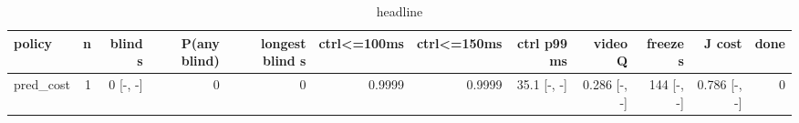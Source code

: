 \begin{table}[t]\centering\small
\begin{tabular}{lrrrrrrrrrrr}\toprule
policy & n & blind s & P(any blind) & longest blind s & ctrl<=100ms & ctrl<=150ms & ctrl p99 ms & video Q & freeze s & J cost & done \\\midrule
pred\_cost & 1 & 0 [-, -] & 0 & 0 & 0.9999 & 0.9999 & 35.1 [-, -] & 0.286 [-, -] & 144 [-, -] & 0.786 [-, -] & 0 \\
\bottomrule\end{tabular}\caption{headline}\end{table}
